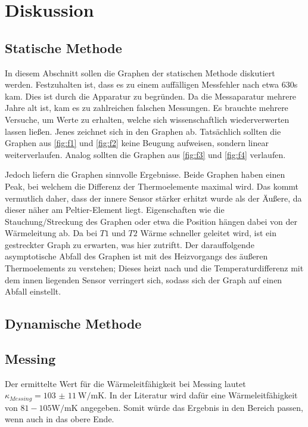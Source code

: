 \section{Diskussion}
\label{sec:Diskussion}

\subsection{Statische Methode}
In diesem Abschnitt sollen die Graphen der statischen Methode diskutiert werden.
Festzuhalten ist, dass es zu einem auffälligen Messfehler nach etwa 630s kam.
Dies ist durch die Apparatur zu begründen. Da die Messaparatur mehrere Jahre 
alt ist, kam es zu zahlreichen falschen Messungen. Es brauchte mehrere Versuche, 
um Werte zu erhalten, welche sich wissenschaftlich wiederverwerten lassen ließen.
Jenes zeichnet sich in den Graphen ab. Tatsächlich sollten die Graphen aus 
\autoref{fig:f1} und \autoref{fig:f2} keine Beugung aufweisen, sondern linear 
weiterverlaufen. Analog sollten die Graphen aus \autoref{fig:f3} und \autoref{fig:f4}
verlaufen.
\par\vspace{0.5em}
\noindent Jedoch liefern die Graphen sinnvolle Ergebnisse. Beide Graphen 
haben einen Peak, bei welchem die Differenz der Thermoelemente maximal wird.
Das kommt vermutlich daher, dass der innere Sensor stärker erhitzt wurde als 
der Äußere, da dieser näher am Peltier-Element liegt. Eigenschaften wie die 
Stauchung/Streckung des Graphen oder etwa die Position hängen dabei von der 
Wärmeleitung ab. Da bei $T1$ und $T2$ Wärme schneller geleitet wird, ist ein 
gestreckter Graph zu erwarten, was hier zutriftt. Der darauffolgende asymptotische 
Abfall des Graphen ist mit des Heizvorgangs des äußeren Thermoelements zu verstehen;
Dieses heizt nach und die Temperaturdifferenz mit dem innen liegenden Sensor 
verringert sich, sodass sich der Graph auf einen Abfall einstellt.

\subsection{Dynamische Methode}

\subsection{Messing}
\noindent Der ermittelte Wert für die Wärmeleitfähigkeit bei Messing lautet $
\kappa_{Messing} = \qty{103(11)}{\watt\per\meter\kelvin}$. In der 
Literatur wird dafür eine Wärmeleitfähigkeit von $81-105 \unit{\watt\per\meter\kelvin}
$ angegeben. Somit würde das Ergebnis in den Bereich passen, wenn auch in das
obere Ende. 
